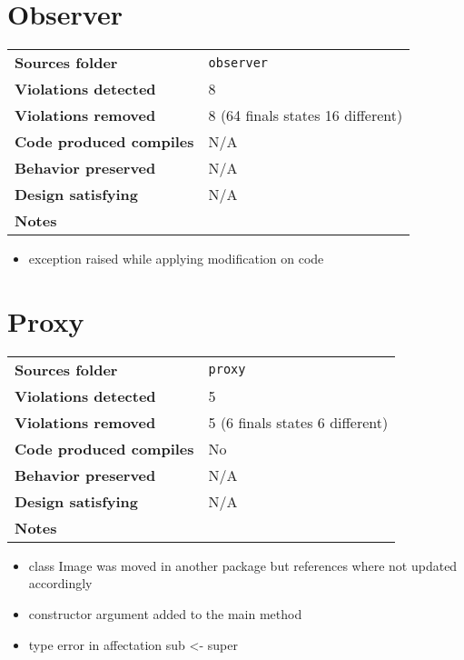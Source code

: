 \documentclass[french]{article}
\begin{document}
\section*{Observer}
\noindent\begin{tabular}{ l p{12cm} }
\textbf{Sources folder} &  \texttt{observer}\\
\textbf{Violations detected} & 8\\
\textbf{Violations removed} & 8 (64 finals states 16 different)\\
\textbf{Code produced compiles} & N/A\\
\textbf{Behavior preserved} & N/A \\
\textbf{Design satisfying} & N/A\\
\textbf{Notes} & \\
\end{tabular}

\begin{itemize}
\item exception raised while applying modification on code
\end{itemize}			

\section*{Proxy}
\noindent\begin{tabular}{ l p{12cm} }
\textbf{Sources folder} &  \texttt{proxy}\\
\textbf{Violations detected} & 5\\
\textbf{Violations removed} & 5 (6 finals states 6 different)\\
\textbf{Code produced compiles} & No\\
\textbf{Behavior preserved} & N/A \\
\textbf{Design satisfying} & N/A\\
\textbf{Notes} & \\
\end{tabular}

\begin{itemize}
\item class Image was moved in another package but references where not updated accordingly
\item constructor argument added to the main method
\item type error in affectation sub <- super
\end{itemize}			
\end{document}
